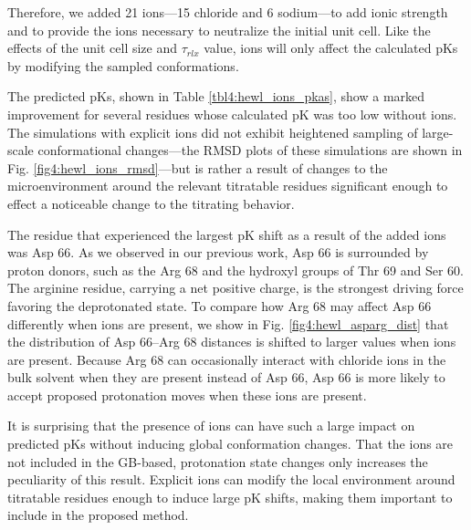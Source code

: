 Therefore, we added 21 ions---15 chloride and 6 sodium---to add ionic strength
and to provide the ions necessary to neutralize the initial unit cell. Like the
effects of the unit cell size and $\tau _ {rlx}$ value, ions will only affect
the calculated pKs by modifying the sampled conformations.

The predicted pKs, shown in Table \ref{tbl4:hewl_ions_pkas}, show a
marked improvement for several residues whose calculated pK was too low
without ions.  The simulations with explicit ions did not exhibit heightened
sampling of large-scale conformational changes---the RMSD plots of these
simulations are shown in Fig. \ref{fig4:hewl_ions_rmsd}---but is rather a result
of changes to the microenvironment around the relevant titratable residues
significant enough to effect a noticeable change to the titrating behavior.

The residue that experienced the largest pK shift as a result of the
added ions was Asp 66. As we observed in our previous work, Asp 66 is surrounded
by proton donors, such as the Arg 68 and the hydroxyl groups of Thr 69 and Ser
60. \cite{Swails_JChemTheoryComput_2012_v8_p4393} The arginine residue, carrying
a net positive charge, is the strongest driving force favoring the deprotonated
state. To compare how Arg 68 may affect Asp 66 differently when ions are
present, we show in Fig. \ref{fig4:hewl_asparg_dist} that the distribution of
Asp 66--Arg 68 distances is shifted to larger values when ions are present.
Because Arg 68 can occasionally interact with chloride ions in the bulk solvent
when they are present instead of Asp 66, Asp 66 is more likely to accept
proposed protonation moves when these ions are present.

It is surprising that the presence of ions can have such a large impact on
predicted pKs without inducing global conformation changes. That the ions
are not included in the GB-based, protonation state changes only increases the
peculiarity of this result. Explicit ions can modify the local environment
around titratable residues enough to induce large pK shifts, making them
important to include in the proposed method.

